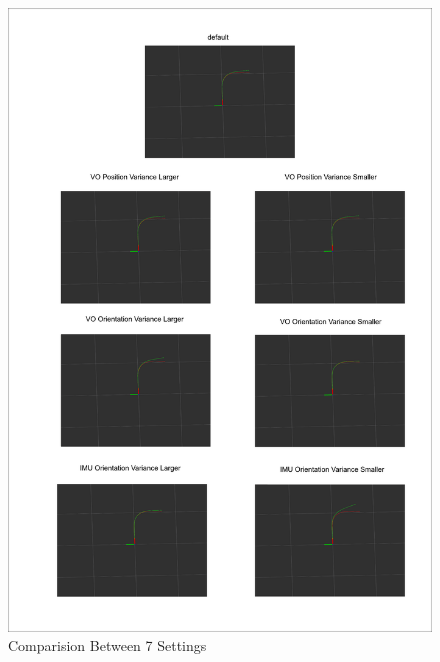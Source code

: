 \documentclass[12pt,a4paper]{article}
\begin{document}
\begin{enumerate}
\begin{figure}[hbt]
  \centering
  \includegraphics[scale=0.27]{combined.png}
  \caption{Comparision Between 7 Settings}
  \label{fig:com}
\end{figure}
\end{enumerate}
\end{document}
